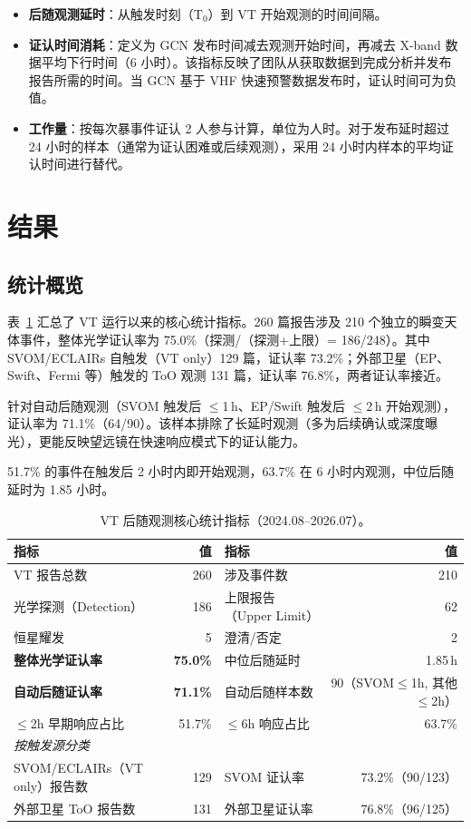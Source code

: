 \documentclass[11pt,a4paper]{article}
\begin{document}
\begin{itemize}
\item \textbf{后随观测延时}：从触发时刻（T$_0$）到 VT 开始观测的时间间隔。
\item \textbf{证认时间消耗}：定义为 GCN 发布时间减去观测开始时间，再减去 X-band 数据平均下行时间（6 小时）。该指标反映了团队从获取数据到完成分析并发布报告所需的时间。当 GCN 基于 VHF 快速预警数据发布时，证认时间可为负值。
\item \textbf{工作量}：按每次暴事件证认 2 人参与计算，单位为人时。对于发布延时超过 24 小时的样本（通常为证认困难或后续观测），采用 24 小时内样本的平均证认时间进行替代。
\end{itemize}

\section{结果}

\subsection{统计概览}

表~\ref{tab:overview} 汇总了 VT 运行以来的核心统计指标。260 篇报告涉及 210 个独立的瞬变天体事件，整体光学证认率为 75.0\%（探测/（探测+上限）= 186/248）。其中 SVOM/ECLAIRs 自触发（VT only）129 篇，证认率 73.2\%；外部卫星（EP、Swift、Fermi 等）触发的 ToO 观测 131 篇，证认率 76.8\%，两者证认率接近。

针对自动后随观测（SVOM 触发后 $\leq$1\,h、EP/Swift 触发后 $\leq$2\,h 开始观测），证认率为 71.1\%（64/90）。该样本排除了长延时观测（多为后续确认或深度曝光），更能反映望远镜在快速响应模式下的证认能力。

51.7\% 的事件在触发后 2 小时内即开始观测，63.7\% 在 6 小时内观测，中位后随延时为 1.85 小时。

\begin{table}[H]
\centering
\caption{VT 后随观测核心统计指标（2024.08--2026.07）。}
\label{tab:overview}
\begin{tabular}{lrlr}
\toprule
指标 & 值 & 指标 & 值 \\
\midrule
VT 报告总数 & 260 & 涉及事件数 & 210 \\
光学探测（Detection） & 186 & 上限报告（Upper Limit） & 62 \\
恒星耀发 & 5 & 澄清/否定 & 2 \\
\textbf{整体光学证认率} & \textbf{75.0\%} & 中位后随延时 & 1.85\,h \\
\textbf{自动后随证认率} & \textbf{71.1\%} & 自动后随样本数 & 90（SVOM$\leq$1h, 其他$\leq$2h） \\
$\leq$2h 早期响应占比 & 51.7\% & $\leq$6h 响应占比 & 63.7\% \\
\midrule
\multicolumn{4}{l}{\textit{按触发源分类}} \\
SVOM/ECLAIRs（VT only）报告数 & 129 & SVOM 证认率 & 73.2\%（90/123） \\
外部卫星 ToO 报告数 & 131 & 外部卫星证认率 & 76.8\%（96/125） \\
\bottomrule
\end{tabular}
\end{table}
\end{document}
